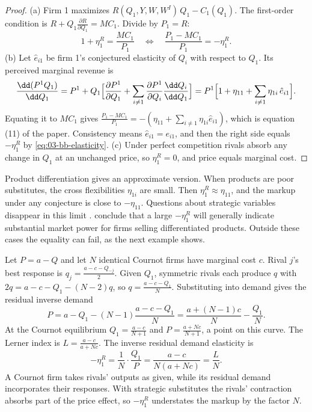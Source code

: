 \begin{proof}
(a) Firm 1 maximizes $R(Q_1, Y, W, W^I)\, Q_1 - C_1(Q_1)$. The first-order condition is $R + Q_1
\frac{\partial R}{\partial Q_1} = MC_1$. Divide by $P_1 = R$:
\begin{equation*}
  1 + \eta^R_1 = \frac{MC_1}{P_1}
  \quad\Longleftrightarrow\quad
  \frac{P_1 - MC_1}{P_1} = -\eta^R_1 .
\end{equation*}
(b) Let $\hat e_{i1}$ be firm 1's conjectured elasticity of $Q_i$ with respect to $Q_1$. Its perceived
marginal revenue is
\begin{equation*}
  \frac{\dd (P^1 Q_1)}{\dd Q_1}
  = P^1 + Q_1\Bigl[\frac{\partial P^1}{\partial Q_1} + \sum_{i \neq 1}\frac{\partial P^1}{\partial Q_i}
    \frac{\dd Q_i}{\dd Q_1}\Bigr]
  = P^1\Bigl[1 + \eta_{11} + \sum_{i \neq 1}\eta_{1i}\,\hat e_{i1}\Bigr].
\end{equation*}
Equating it to $MC_1$ gives $\frac{P_1 - MC_1}{P_1} = -(\eta_{11} + \sum_{i \neq 1}\eta_{1i}\hat e_{i1})$,
which is equation (11) of the paper. Consistency means $\hat e_{i1} = e_{i1}$, and then the right side equals
$-\eta^R_1$ by \eqref{eq:03-bb-elasticity}. (c) Under perfect competition rivals absorb any change in $Q_1$ at
an unchanged price, so $\eta^R_1 = 0$, and price equals marginal cost.
\end{proof}

Product differentiation gives an approximate version. When products are poor substitutes, the cross
flexibilities $\eta_{1i}$ are small. Then $\eta^R_1 \approx \eta_{11}$, and the markup under any conjecture is
close to $-\eta_{11}$. Questions about strategic variables disappear in this limit \citep{Sonnenschein1968}.
\citet[p.~290]{BakerBresnahan1988} conclude that a large $-\eta^R_1$ will generally indicate substantial
market power for firms selling differentiated products. Outside these cases the equality can fail, as the
next example shows.

\begin{example}\label{ex:03-cournot-residual}
Let $P = a - Q$ and let $N$ identical Cournot firms have marginal cost $c$. Rival $j$'s best response is $q_j
= \frac{a - c - Q_{-j}}{2}$. Given $Q_1$, symmetric rivals each produce $q$ with $2q = a - c - Q_1 - (N -
2)q$, so $q = \frac{a - c - Q_1}{N}$. Substituting into demand gives the residual inverse demand
\begin{equation*}
  P = a - Q_1 - (N - 1)\frac{a - c - Q_1}{N} = \frac{a + (N - 1)c}{N} - \frac{Q_1}{N}.
\end{equation*}
At the Cournot equilibrium $Q_1 = \frac{a - c}{N + 1}$ and $P = \frac{a + Nc}{N + 1}$, a point on this curve.
The Lerner index is $L = \frac{a - c}{a + Nc}$. The inverse residual demand elasticity is
\begin{equation*}
  -\eta^R_1 = \frac{1}{N}\cdot\frac{Q_1}{P} = \frac{a - c}{N(a + Nc)} = \frac{L}{N} .
\end{equation*}
A Cournot firm takes rivals' outputs as given, while its residual demand incorporates their responses. With
strategic substitutes the rivals' contraction absorbs part of the price effect, so $-\eta^R_1$ understates the
markup by the factor $N$.
\end{example}

